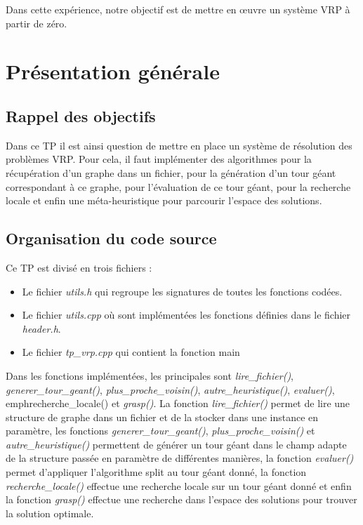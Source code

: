 \documentclass[12pt]{article}
\begin{document}
    \par
    Dans cette expérience, notre objectif est de mettre en œuvre un système VRP à partir de zéro.
    
    \newpage

	\tableofcontents
	\listoffigures
	
	\newpage
	
	\section{Présentation générale}
	\subsection{Rappel des objectifs}
	Dans ce TP il est ainsi question de mettre en place un système de résolution des problèmes VRP. Pour cela, il faut implémenter des algorithmes pour la récupération d'un graphe dans un fichier, pour la génération d'un tour géant correspondant à ce graphe, pour l'évaluation de ce tour géant, pour la recherche locale et enfin une méta-heuristique pour parcourir l'espace des solutions.

	\subsection{Organisation du code source}
	Ce TP est divisé en trois fichiers :\\\par
	\begin{itemize}
	    \item Le fichier \emph{utils.h} qui regroupe les signatures de toutes les fonctions codées.
	    \item Le fichier \emph{utils.cpp} où sont implémentées les fonctions définies dans le fichier \emph{header.h}.
	    \item Le fichier \emph{tp\_vrp.cpp} qui contient la fonction main\\
	\end{itemize}\par
	 Dans les fonctions implémentées, les principales sont \emph{lire\_fichier()}, \emph{generer\_tour\_geant()}, \emph{plus\_proche\_voisin()}, \emph{autre\_heuristique()}, \emph{evaluer()}, emph{recherche\_locale()} et \emph{grasp()}. La fonction \emph{lire\_fichier()} permet de lire une structure de graphe dans un fichier et de la stocker dans une instance en paramètre, les fonctions \emph{generer\_tour\_geant()}, \emph{plus\_proche\_voisin()} et \emph{autre\_heuristique()} permettent de générer un tour géant dans le champ adapte de la structure passée en paramètre de différentes manières, la fonction \emph{evaluer()} permet d'appliquer l'algorithme split au tour géant donné, la fonction \emph{recherche\_locale()} effectue une recherche locale sur un tour géant donné et enfin la fonction \emph{grasp()} effectue une recherche dans l'espace des solutions pour trouver la solution optimale.\\\par
	 
\end{document}
